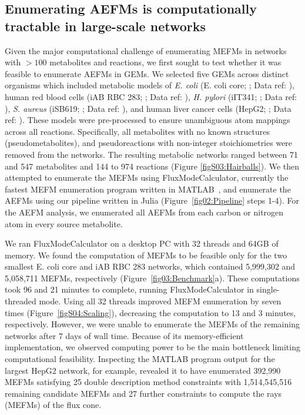\documentclass[12pt]{article}
\begin{document}
\subsection*{Enumerating AEFMs is computationally tractable in large-scale networks}

Given the major computational challenge of enumerating MEFMs in
networks with $>100$ metabolites and reactions, we first sought to test
whether it was feasible to enumerate AEFMs in GEMs. We selected five GEMs
across distinct organisms which included metabolic models of \textit{E.
coli} (E. coli core; \citealt{OrthJeffreyD2010RaUo}; Data ref:
\citealt{OrthJeffreyD2010RaUoDATASET}), human red blood cells (iAB RBC
283; \citealt{BordbarAarash2011iApd}; Data ref:
\citealt{BordbarAarash2011iApdDATASET}), \textit{H. pylori} (iIT341;
\citealt{ThieleInes2005EMRo}; Data ref:
\citealt{ThieleInes2005EMRoDATASET}), \textit{S. aureus} (iSB619;
\citealt{BeckerScottA2005Grot}; Data ref:
\citealt{BeckerScottA2005GrotDATASET}), and human liver cancer cells
(HepG2; \citealt{NilssonAvlant2020Qaoa}; Data ref:
\citealt{NilssonAvlant2020QaoaDATASET}). These models were pre-processed
to ensure unambiguous atom mappings across all reactions. Specifically,
all metabolites with no known structures (pseudometabolites), and
pseudoreactions with non-integer stoichiometries were removed from the
networks. The resulting metabolic networks ranged between 71 and 547
metabolites and 144 to 974 reactions (Figure \ref{figS03:Hairballs}). We
then attempted to enumerate the MEFMs using FluxModeCalculator, currently
the fastest MEFM enumeration program written in
MATLAB~\citep{vanKlinkenJanBert2016Faet}, and enumerate the AEFMs using
our pipeline written in Julia (Figure~\ref{fig02:Pipeline} steps 1-4). For
the AEFM analysis, we enumerated all AEFMs from each carbon or nitrogen
atom in every source metabolite. 

We ran FluxModeCalculator on a desktop PC with 32 threads and 64GB of
memory. We found the computation of MEFMs to be feasible only for the two
smallest E. coli core and iAB RBC 283 networks, which contained 5,999,302
and 5,058,711 MEFMs, respectively (Figure~\ref{fig03:Benchmark}a). These
computations took 96 and 21 minutes to complete, running
FluxModeCalculator in single-threaded mode. Using all 32 threads improved MEFM
enumeration by seven times (Figure~\ref{figS04:Scaling}), decreasing the
computation to 13 and 3 minutes, respectively. However, we were unable to
enumerate the MEFMs of the remaining networks after 7 days of wall time.
Because of its memory-efficient implementation, we observed computing
power to be the main bottleneck limiting computational feasibility.
Inspecting the MATLAB program output for the largest HepG2 network, for
example, revealed it to have enumerated 392,990 MEFMs satisfying 25 double
description method constraints with 1,514,545,516 remaining candidate
MEFMs and 27 further constraints to compute the rays (MEFMs) of the flux
cone.
\end{document}
